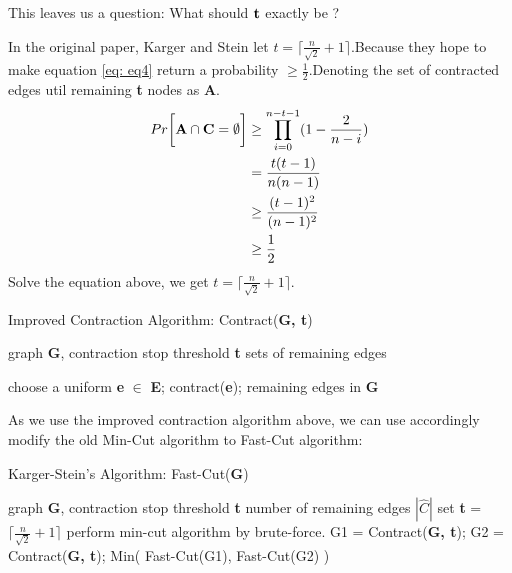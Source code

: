 \documentclass[a4paper, 12pt, titlepage]{article}
\begin{document}
This leaves us a question: What should ${\bf t}$ exactly be ?

In the original paper, Karger and Stein let $t = \lceil \frac{n}{\sqrt{2}} + 1 \rceil$.Because they hope to make equation \ref{eq: eq4}
return a probability $\geq \frac{1}{2}$.Denoting the set of contracted edges util remaining \textbf{t} nodes as \textbf{A}.
\begin{equation}\label{eq: eq5}
    \begin{aligned}
        Pr \bigg[ {\bf A} \cap {\bf C} = \emptyset \bigg] &\geq \prod_{i = 0}^{n - t - 1} (1 - \frac{2}{n - i}) \\
                                                          &= \frac{t (t - 1)}{n (n - 1)} \\
                                                          &\geq \frac{(t - 1)^2}{(n - 1)^2} \\
                                                          &\geq \frac{1}{2}                                       
    \end{aligned}
\end{equation}
Solve the equation above, we get $t = \lceil \frac{n}{\sqrt{2}} + 1 \rceil$.


\begin{algorithm}[h]
    \caption{Improved Contraction Algorithm: Contract({\bf G, t})}
    \begin{algorithmic}
        \Require graph {\bf G}, contraction stop threshold {\bf t}
        \Ensure sets of remaining edges

            \State choose a uniform {\bf e} $\in$ {\bf E};
            \State contract({\bf e});
        \EndWhile
        \State \Return remaining edges in {\bf G}
    \end{algorithmic}
\end{algorithm}

As we use the improved contraction algorithm above, we can use accordingly modify the old Min-Cut algorithm to Fast-Cut algorithm:

\begin{algorithm}[h]
    \caption{Karger-Stein's Algorithm: Fast-Cut({\bf G})}
    \begin{algorithmic}[1]
        \Require graph {\bf G}, contraction stop threshold {\bf t}
        \Ensure number of remaining edges {\bf$|\hat{C}|$}
        \State set {\bf t} = $\lceil \frac{n}{\sqrt{2}} + 1 \rceil$
            \State perform min-cut algorithm by brute-force.
        \Else
            \State G1 = Contract({\bf G, t});
            \State G2 = Contract({\bf G, t});
        \EndIf
        \State \Return Min( {Fast-Cut(G1), Fast-Cut(G2)} )
    \end{algorithmic}
\end{algorithm}
\end{document}
